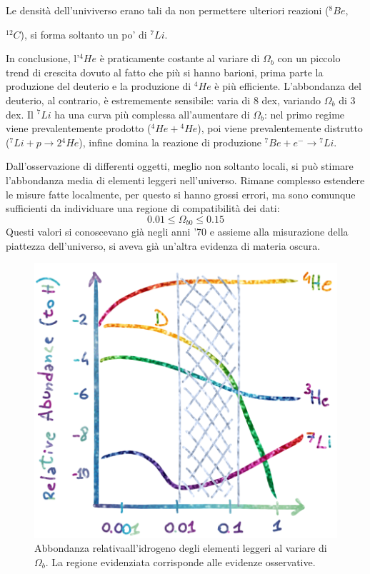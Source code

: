 Le densità dell'univiverso erano tali da non permettere ulteriori reazioni (${^8Be}$, {$^{12}C$), si forma soltanto un po' di $^7{Li}$. 

In conclusione, l'${^4He}$ è praticamente costante al variare di $\Omega_b$ con un piccolo trend di crescita dovuto al fatto che più si hanno barioni, prima parte la produzione del deuterio e la produzione di ${^4He}$ è più efficiente. L'abbondanza del deuterio, al contrario, è estrememente sensibile: varia di $8$ dex, variando $\Omega_b$ di $3$ dex. Il ${^7Li}$ ha una curva più complessa all'aumentare di $\Omega_b$: nel primo regime viene prevalentemente prodotto (${^4He}+{^4He}$), poi viene prevalentemente distrutto (${^7Li}+p\rightarrow 2{^4He}$), infine domina la reazione di produzione ${^7Be+e^- \rightarrow {^7Li}}$.

Dall'osservazione di differenti oggetti, meglio non soltanto locali, si può stimare l'abbondanza media di elementi leggeri nell'universo. Rimane complesso estendere le misure fatte localmente, per questo si hanno grossi errori, ma sono comunque sufficienti da individuare una regione di compatibilità dei dati:
$$
0.01 \le \Omega_{b0} \le 0.15
$$
Questi valori si conoscevano già negli anni '70 e assieme alla misurazione della piattezza dell'universo, si aveva già un'altra evidenza di materia oscura. 

\begin{figure}[h]
    \centering
    \includegraphics[width=.8 \textwidth]{Pictures/5/eleggeriomegab.png}
    \caption{Abbondanza relativaall'idrogeno degli elementi leggeri al variare di $\Omega_b$. La regione evidenziata corrisponde alle evidenze osservative.}
\end{figure}

}
